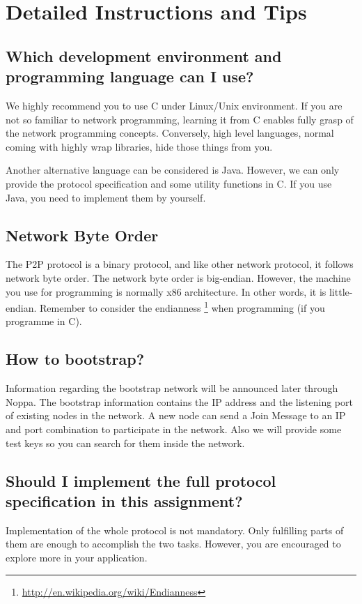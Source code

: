 \documentclass[12pt, a4paper]{article}
\begin{document}
\section{Detailed Instructions and Tips}
\subsection*{Which development environment and programming language can I use?}
We highly recommend you to use C under Linux/Unix environment.
If you are not so familiar to network programming, learning it from C enables fully grasp of the network programming concepts.
Conversely, high level languages, normal coming with highly wrap libraries, hide those things from you.

Another alternative language can be considered is Java.
However, we can only provide the protocol specification and some utility functions in C.
If you use Java, you need to implement them by yourself.

\subsection*{Network Byte Order}
The P2P protocol is a binary protocol, and like other network protocol, it follows network byte order.
The network byte order is big-endian.
However, the machine you use for programming is normally x86 architecture.
In other words, it is little-endian.
Remember to consider the endianness \footnote{\url{http://en.wikipedia.org/wiki/Endianness}} when programming (if you programme in C).

\subsection*{How to bootstrap?}
Information regarding the bootstrap network will be announced later through Noppa.
The bootstrap information contains the IP address and the listening port of existing nodes in the network.
A new node can send a Join Message to an IP and port combination to participate in the network.
Also we will provide some test keys so you can search for them inside the network.

\subsection*{Should I implement the full protocol specification in this assignment?}
Implementation of the whole protocol is not mandatory.
Only fulfilling parts of them are enough to accomplish the two tasks.
However, you are encouraged to explore more in your application.
\end{document}
